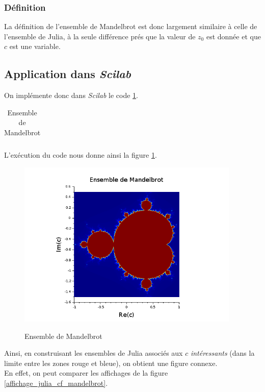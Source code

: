 \documentclass[a4paper,10pt]{report}
\begin{document}
\subsubsection{Définition}
La définition de l'ensemble de Mandelbrot est donc largement similaire à celle de l'ensemble de Julia, à la seule différence prés que la valeur de $z_0$ est donnée et que $c$ est une variable.

\subsection{Application dans \textit{Scilab}}
On implémente donc dans \textit{Scilab} le code \ref{code_mandelbrot}.

\begin{table}[H]
\caption{Ensemble de Mandelbrot}
\begin{tabular}{l}
\\
\end{tabular}
\label{code_mandelbrot}
\end{table}

L'exécution du code nous donne ainsi la figure \ref{affichage_mandelbrot}.
\begin{figure}[H]
\caption{Ensemble de Mandelbrot}
\centering
\includegraphics[height=8cm]{mandelbrot1.png}
\label{affichage_mandelbrot}
\end{figure}
Ainsi, en construisant les ensembles de Julia associés aux $c$ \textit{intéressants} (dans la limite entre les zones rouge et bleue), on obtient une figure connexe.\\
\indent En effet, on peut comparer les affichages de la figure \ref{affichage_julia_cf_mandelbrot}.
\end{document}
